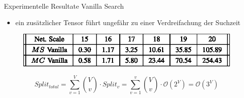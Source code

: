 \documentclass{beamer}
\begin{document}
\begin{frame}{Experimentelle Resultate Vanilla Search}
	\begin{itemize}
		\item ein zusätzlicher Tensor führt ungefähr zu einer Verdreifachung der Suchzeit
	\end{itemize}
	\begin{figure}
		\includegraphics{table_02}
	\end{figure}
	\begin{equation*}
		Split_{total} = \sum^V_{v=1} \binom{V}{v} \cdot Split_v = \sum^v_{v=1} \binom{V}{v} \cdot \mathcal{O} \left(2^V \right) = \mathcal{O} \left(3^V \right)
	\end{equation*}
\end{frame}
\end{document}
